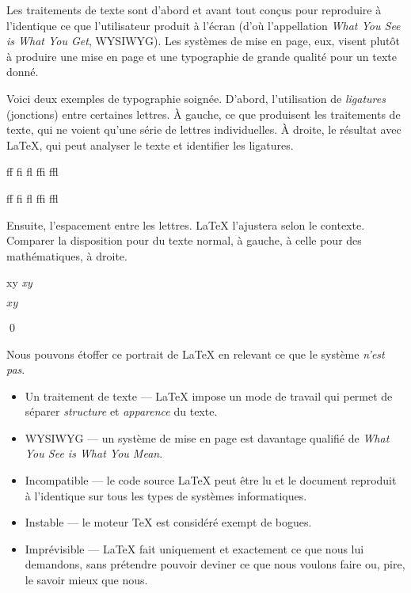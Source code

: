 \begin{exemple}
  Les traitements de texte sont d'abord et avant tout conçus pour
  reproduire à l'identique ce que l'utilisateur produit à l'écran
  (d'où l'appellation \emph{What You See is What You Get}, WYSIWYG).
  Les systèmes de mise en page, eux, visent plutôt à produire une mise
  en page et une typographie de grande qualité pour un texte donné.

  Voici deux exemples de typographie soignée. D'abord, l'utilisation
  de \emph{ligatures} (jonctions) entre certaines lettres. À gauche,
  ce que produisent les traitements de texte, qui ne voient qu'une
  série de lettres individuelles. À droite, le résultat avec {\LaTeX},
  qui peut analyser le texte et identifier les ligatures.
  \begin{demo}
    \centering
    \begin{minipage}{0.3\linewidth}
      \rmfamily f\/f \quad f\/i \quad f\/l \quad f\/f\/i \quad
      f\/f\/l
    \end{minipage}
    \qquad
    \begin{minipage}{0.3\linewidth}
      \rmfamily ff \quad fi \quad fl \quad ffi \quad ffl
    \end{minipage}
  \end{demo}

  Ensuite, l'espacement entre les lettres. {\LaTeX} l'ajustera selon
  le contexte. Comparer la disposition pour du texte normal, à gauche,
  à celle pour des mathématiques, à droite.
  \begin{demo}
    \centering
    \begin{minipage}{0.3\linewidth}
      \rmfamily xy \quad \emph{xy}
    \end{minipage}
    \qquad
    \begin{minipage}{0.3\linewidth}
      $xy$
    \end{minipage}
  \end{demo}
  \qed
\end{exemple}

Nous pouvons étoffer ce portrait de {\LaTeX} en relevant ce que le
système \emph{n'est pas}.

\begin{itemize}
\item Un traitement de texte --- {\LaTeX} impose un mode de travail
  qui permet de séparer \emph{structure} et \emph{apparence} du texte.
\item WYSIWYG --- un système de mise en page est davantage qualifié de
  \emph{What You See is What You Mean}.
\item Incompatible --- le code source {\LaTeX} peut être lu et le
  document reproduit à l'identique sur tous les types de systèmes
  informatiques.
\item Instable --- le moteur {\TeX} est considéré exempt de bogues.
\item Imprévisible --- {\LaTeX} fait uniquement et exactement ce que
  nous lui demandons, sans prétendre pouvoir deviner ce que nous
  voulons faire ou, pire, le savoir mieux que nous.
\end{itemize}


